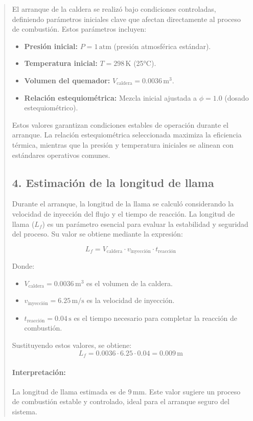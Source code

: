 \documentclass[11pt, a4paper]{article}
\begin{document}
\begin{quote}
\begin{center}
\begin{adjustwidth}{-1.7cm}{-1cm}
El arranque de la caldera se realizó bajo condiciones controladas, definiendo parámetros iniciales clave que afectan directamente al proceso de combustión. Estos parámetros incluyen:

\begin{itemize}
    \item \textbf{Presión inicial:} \(P = 1 \, \text{atm}\) (presión atmosférica estándar).
    \item \textbf{Temperatura inicial:} \(T = 298 \, \text{K}\) (25°C).
    \item \textbf{Volumen del quemador:} \(V_{\text{caldera}} = 0.0036 \, \text{m}^3\).
    \item \textbf{Relación estequiométrica:} Mezcla inicial ajustada a \(\phi = 1.0\) (dosado estequiométrico).
\end{itemize}

Estos valores garantizan condiciones estables de operación durante el arranque. La relación estequiométrica seleccionada maximiza la eficiencia térmica, mientras que la presión y temperatura iniciales se alinean con estándares operativos comunes.

\subsection*{4. Estimación de la longitud de llama}

Durante el arranque, la longitud de la llama se calculó considerando la velocidad de inyección del flujo y el tiempo de reacción. La longitud de llama (\(L_f\)) es un parámetro esencial para evaluar la estabilidad y seguridad del proceso. Su valor se obtiene mediante la expresión:

\[
L_f = V_{\text{caldera}} \cdot v_{\text{inyección}} \cdot t_{\text{reacción}}
\]

Donde:
\begin{itemize}
    \item \(V_{\text{caldera}} = 0.0036 \, \text{m}^3\) es el volumen de la caldera.
    \item \(v_{\text{inyección}} = 6.25 \, \text{m/s}\) es la velocidad de inyección.
    \item \(t_{\text{reacción}} = 0.04 \, \text{s}\) es el tiempo necesario para completar la reacción de combustión.
\end{itemize}

Sustituyendo estos valores, se obtiene:
\[
L_f = 0.0036 \cdot 6.25 \cdot 0.04 = 0.009 \, \text{m}
\]

\paragraph{Interpretación:}
La longitud de llama estimada es de \(9 \, \text{mm}\). Este valor sugiere un proceso de combustión estable y controlado, ideal para el arranque seguro del sistema.


\end{adjustwidth}
\end{center}
\end{quote}
\end{document}
